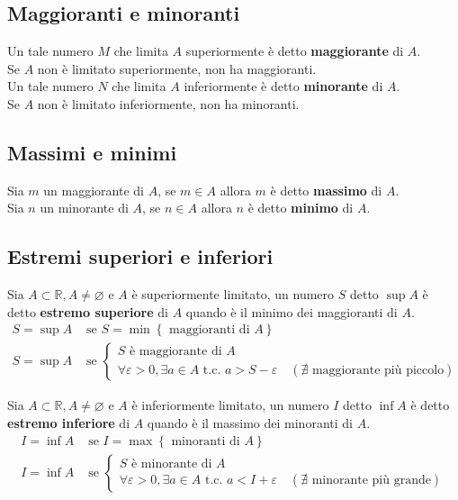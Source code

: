 \documentclass[a4paper]{article}
\begin{document}
\subsection{Maggioranti e minoranti}
Un tale numero \(M\) che limita \(A\) superiormente è detto \textbf{maggiorante} di \(A\). \\
Se \(A\) non è limitato superiormente, non ha maggioranti. \\
Un tale numero \(N\) che limita \(A\) inferiormente è detto \textbf{minorante} di \(A\). \\
Se \(A\) non è limitato inferiormente, non ha minoranti.


\subsection{Massimi e minimi}
Sia \(m\) un maggiorante di \(A\), se \(m \in A\) allora \(m\) è detto \textbf{massimo} di \(A\). \\
Sia \(n\) un minorante di \(A\), se \(n \in A\) allora \(n\) è detto \textbf{minimo} di \(A\).
	

\subsection{Estremi superiori e inferiori}
Sia \(A \subset \mathbb{R}, A \neq \varnothing\) e \(A\) è superiormente limitato, un numero \(S\) detto \(\sup A\) è detto \textbf{estremo superiore} di \(A\) quando è il minimo dei maggioranti di \(A\).
\begin{align*}
	\tag{definizione}
	S = \sup A &\text{ se } S = \min \left\{ \text{ maggioranti di } A \right\} \\
	\tag{caratterizzazione}
	S = \sup A &\text{ se }
	\begin{cases}
		S \text{ è maggiorante di } A \\
		\forall \varepsilon > 0, \exists a \in A \text{ t.c. } a > S - \varepsilon \quad \left( \nexists \text{ maggiorante più piccolo} \right)
	\end{cases}
\end{align*}

Sia \(A \subset \mathbb{R}, A \neq \varnothing\) e \(A\) è inferiormente limitato, un numero \(I\) detto \(\inf A\) è detto \textbf{estremo inferiore} di \(A\) quando è il massimo dei minoranti di \(A\).
\begin{align*}
	\tag{definizione}
	I = \inf A &\text{ se } I = \max \left\{ \text{ minoranti di } A \right\} \\
	\tag{caratterizzazione}
	I = \inf A &\text{ se }
	\begin{cases}
		S \text{ è minorante di } A \\
		\forall \varepsilon > 0, \exists a \in A \text{ t.c. } a < I + \varepsilon \quad \left( \nexists \text{ minorante più grande} \right)
	\end{cases}
\end{align*}
\end{document}
